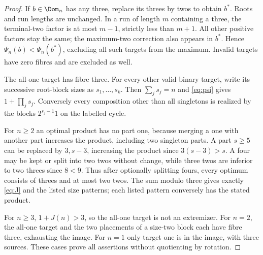 \begin{proof}
If $b\in\Dom_n$ has any three, replace its threes by twos to obtain
$b^*$. Roots and run lengths are unchanged. In a run of length $m$
containing a three, the terminal-two factor is at most $m-1$, strictly
less than $m+1$. All other positive factors stay the same; the
maximum-two correction also appears in $b^*$. Hence
$\Psi_n(b)<\Psi_n(b^*)$, excluding all such targets from the maximum.
Invalid targets have zero fibres and are excluded as well.

The all-one target has fibre three. For every other valid binary target,
write its successive root-block sizes as $s_1,\ldots,s_k$. Then
$\sum_j s_j=n$ and \eqref{eq:psi} gives $1+\prod_j s_j$.
Conversely every composition other than all singletons is realized by
the blocks $2^{s_j-1}1$ on the labelled cycle.

For $n\ge2$ an optimal product has no part one, because merging a one
with another part increases the product, including two singleton parts.
A part $s\ge5$ can be replaced by $3,s-3$, increasing the product since
$3(s-3)>s$. A four may be kept or split into two twos without change,
while three twos are inferior to two threes since $8<9$.
Thus after optionally splitting fours, every optimum consists of threes
and at most two twos. The sum modulo three gives exactly
\eqref{eq:J} and the listed size patterns; each listed pattern conversely
has the stated product.

For $n\ge3$, $1+J(n)>3$, so the all-one target is not an extremizer.
For $n=2$, the all-one target and the two placements of a size-two block
each have fibre three, exhausting the image. For $n=1$ only target one
is in the image, with three sources. These cases prove all assertions
without quotienting by rotation.
\end{proof}
